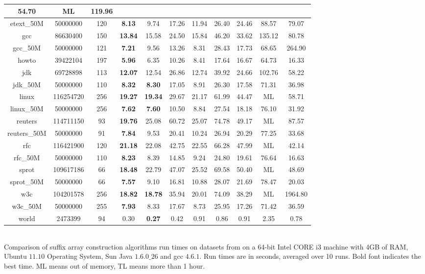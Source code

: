 \begin{table}
{\begin{tabular}{| c | c | c | c | c | c | c |
c | c | c | c |}
54.70 & ML & 119.96
\\
\hline
etext\_50M & 50000000 & 120 & {\bf 8.13} & { 9.74} & 17.26 & 11.94 &
26.40 & 24.46 & 88.57 & 79.07
\\
\hline
gcc & 86630400 & 150 & {\bf 13.84} & { 15.58} & 24.50 & 15.84 & 46.20 & 33.62
& 135.12 & 80.78
\\
\hline
gcc\_50M & 50000000 & 121 & {\bf 7.21} &  9.56 & 13.26 & { 8.31} & 28.43 &
17.73 & 68.65 & 264.90
\\
\hline
howto & 39422104 & 197 & {\bf 5.96} & { 6.35} & 10.26 & 8.41 & 17.64 & 16.67
& 64.73 & 16.33
\\
\hline
jdk & 69728898 & 113 & {\bf 12.07} & { 12.54} & 26.86 & { 12.74} & 39.92 &
24.66 & 102.76 & 58.22
\\
\hline
jdk\_50M & 50000000 & 110 & {\bf 8.32} & {\bf 8.30} & 17.05 & { 8.91} & 26.30
& 17.58 & 71.31 & 36.98
\\
\hline
linux & 116254720 & 256 & {\bf 19.27} & {\bf 19.34} & 29.67 & { 21.17} &
61.99 & 44.47 & ML & 58.71
\\
\hline
linux\_50M & 50000000 & 256 & {\bf 7.62} & {\bf 7.60} & 10.50 & { 8.84} &
27.54 & 18.18 & 76.10 & 31.92
\\
\hline
reuters & 114711150 & 93 & {\bf 19.76} & { 25.08} & 60.72 & { 25.07} &
74.78 & 49.17 & ML & 87.57
\\
\hline
reuters\_50M & 50000000 & 91 & {\bf 7.84} & { 9.53} & 20.41 & 10.24 & 26.94 &
20.29 & 77.25 & 33.68
\\
\hline
rfc & 116421900 & 120 & {\bf 21.18} & { 22.08} & 42.75 & 22.55 & 66.28 &
47.99 & ML & 42.14
\\
\hline
rfc\_50M & 50000000 & 110 & {\bf 8.23} & { 8.39} & 14.85 & 9.24 & 24.80
& 19.61 & 76.64 & 16.63
\\
\hline
sprot & 109617186 & 66 & {\bf 18.48} & { 22.79} & 47.07 & 25.52 & 69.58 &
50.40 & ML & 48.69
\\
\hline
sprot\_50M & 50000000 & 66 & {\bf 7.57} & { 9.10} & 16.81 & 10.88 & 28.07 &
21.69 & 78.47 & 20.03
\\
\hline
w3c & 104201578 & 256 & {\bf 18.82} & {\bf 18.78} & 35.94 & { 20.01} & 74.09
& 38.29 & ML & 1964.80
\\
\hline
w3c\_50M & 50000000 & 255 & {\bf 7.93} & { 8.33} & 17.67 & 8.73 & 25.95 &
17.26 & 71.42 & 36.59
\\
\hline
world & 2473399 & 94 & { 0.30} & {\bf 0.27} &  0.42 & 0.91 & 0.86 & 0.91
& 2.35 & 0.78
\\
\hline
\end{tabular}
}\\
Comparison of suffix array construction
algorithms run times on datasets from \cite{ScSt07} on a 64-bit Intel CORE
i3 machine with 4GB of RAM, Ubuntu $11.10$ Operating System, Sun Java $1.6.0\_26$ and gcc $4.6.1$. Run times are in seconds, averaged over 10 runs. Bold font indicates the
best time.  ML means out of memory, TL means more than 1 hour.
\end{table}  

